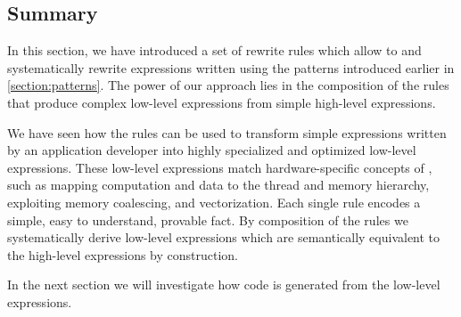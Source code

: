 \FloatBarrier



\subsection{Summary}
In this section, we have introduced a set of rewrite rules which allow to  and systematically rewrite expressions written using the patterns introduced earlier in \autoref{section:patterns}.
The power of our approach lies in the composition of the rules that produce complex low-level expressions from simple high-level expressions.

We have seen how the rules can be used to transform simple expressions written by an application developer into highly specialized and optimized low-level \OpenCL expressions.
These low-level expressions match hardware-specific concepts of \OpenCL, such as mapping computation and data to the thread and memory hierarchy, exploiting memory coalescing, and vectorization.
Each single rule encodes a simple, easy to understand, provable fact.
By composition of the rules we systematically derive low-level expressions which are semantically equivalent to the high-level expressions by construction.

In the next section we will investigate how \OpenCL code is generated from the low-level expressions.

